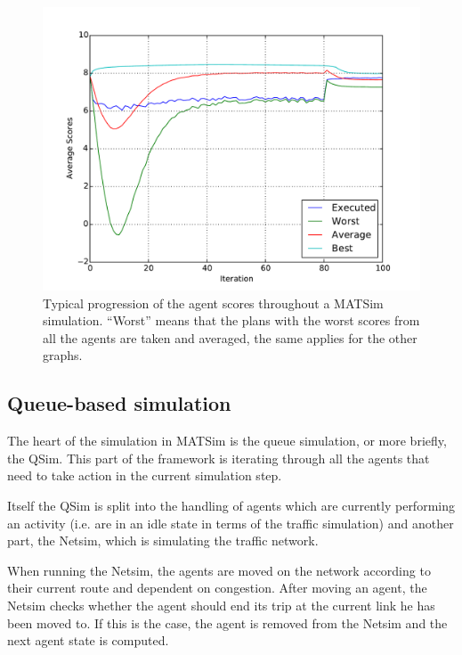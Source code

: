 \begin{figure}
    \centering
    \includegraphics[width=1.0\textwidth]{figures/scorestats.pdf}
    \caption{Typical progression of the agent scores throughout a MATSim simulation.
    ``Worst'' means that the plans with the worst scores from all the agents are taken
    and averaged, the same applies for the other graphs. }
    \label{fig:scorestats}
\end{figure}

\subsection{Queue-based simulation}

The heart of the simulation in MATSim is the queue simulation, or more briefly,
the QSim. This part of the framework is iterating through all the agents that need
to take action in the current simulation step.

Itself the QSim is split into the handling of agents which are currently performing
an activity (i.e. are in an idle state in terms of the traffic simulation) and another
part, the Netsim, which is simulating the traffic network.

When running the Netsim, the agents are moved on the network according to their
current route and dependent on congestion. After moving an agent, the Netsim checks
whether the agent should end its trip at the current link he has been moved to. If
this is the case, the agent is removed from the Netsim and the next agent state is computed.

